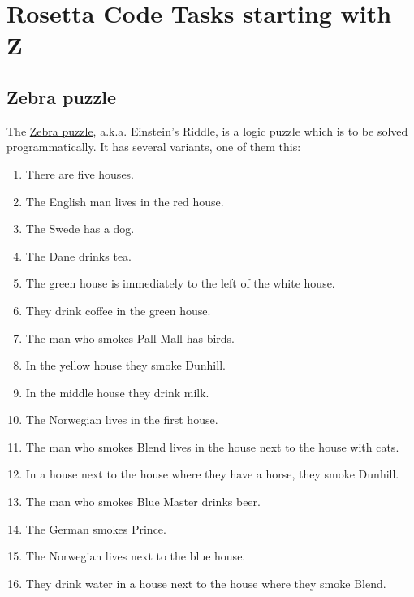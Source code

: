 %
%
%

\chapter{Rosetta Code Tasks starting with Z}

\section*{Zebra puzzle}

The \href{http://en.wikipedia.org/wiki/Zebra\_puzzle}{Zebra puzzle},
a.k.a. Einstein's Riddle, is a logic puzzle which is to be solved
programmatically. It has several variants, one of them this:

\begin{enumerate}
\item
  There are five houses.
\item
  The English man lives in the red house.
\item
  The Swede has a dog.
\item
  The Dane drinks tea.
\item
  The green house is immediately to the left of the white house.
\item
  They drink coffee in the green house.
\item
  The man who smokes Pall Mall has birds.
\item
  In the yellow house they smoke Dunhill.
\item
  In the middle house they drink milk.
\item
  The Norwegian lives in the first house.
\item
  The man who smokes Blend lives in the house next to the house with
  cats.
\item
  In a house next to the house where they have a horse, they smoke
  Dunhill.
\item
  The man who smokes Blue Master drinks beer.
\item
  The German smokes Prince.
\item
  The Norwegian lives next to the blue house.
\item
  They drink water in a house next to the house where they smoke Blend.
\end{enumerate}

